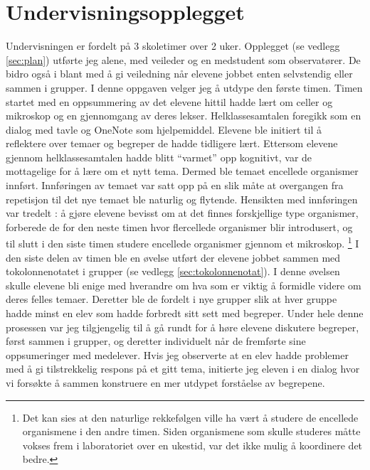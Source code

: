 \documentclass[main.tex]{subfiles}
\begin{document}
\section*{Undervisningsopplegget}
\label{sec:1}
Undervisningen er fordelt på 3 skoletimer over 2 uker. Opplegget (se vedlegg \ref{sec:plan}) 
utførte jeg alene, med veileder og en medstudent som observatører. De bidro også i blant 
med å gi veiledning når elevene jobbet enten selvstendig eller sammen i grupper. I denne 
oppgaven velger jeg å utdype den første timen. 
\newline
\newline
Timen startet med en oppsummering av det elevene hittil hadde lært om celler og mikroskop og en 
gjennomgang av deres lekser. Helklassesamtalen foregikk som en dialog med tavle og OneNote som hjelpemiddel. 
Elevene ble initiert til å reflektere over temaer og begreper de hadde tidligere lært. Ettersom elevene gjennom 
helklassesamtalen hadde blitt ``varmet'' opp kognitivt, var de mottagelige for å lære om et nytt tema. 
Dermed ble temaet encellede organismer innført. Innføringen av temaet var satt opp på en slik 
måte at overgangen fra repetisjon til det nye temaet ble naturlig og flytende. Hensikten med 
innføringen var tredelt : å gjøre elevene bevisst om at det finnes forskjellige type organismer, 
forberede de for den neste timen hvor flercellede organismer blir introdusert, og 
til slutt i den siste timen studere encellede organismer gjennom et mikroskop. \footnote[2]{Det kan sies 
at den naturlige rekkefølgen ville ha vært å studere de encellede organismene i den andre timen. 
Siden organismene som skulle studeres måtte vokses frem i laboratoriet over en ukestid, var det ikke 
mulig å koordinere det bedre.}
\newline
\newline
I den siste delen av timen ble en øvelse utført der elevene jobbet sammen med tokolonnenotatet i 
grupper (se vedlegg \ref{sec:tokolonnenotat}). I denne øvelsen skulle elevene bli enige med hverandre om hva som er 
viktig å formidle videre om deres felles temaer. Deretter ble de fordelt i nye grupper slik at hver 
gruppe hadde minst en elev som hadde forbredt sitt sett med begreper. Under hele denne prosessen var jeg 
tilgjengelig til å gå rundt for å høre elevene diskutere begreper, først sammen i grupper, og 
deretter individuelt når de fremførte sine oppsumeringer med medelever. Hvis jeg observerte at en 
elev hadde problemer med å gi tilstrekkelig respons på et gitt tema, initierte jeg eleven i en dialog 
hvor vi forsøkte å sammen konstruere en mer utdypet forståelse av begrepene.
\end{document}
